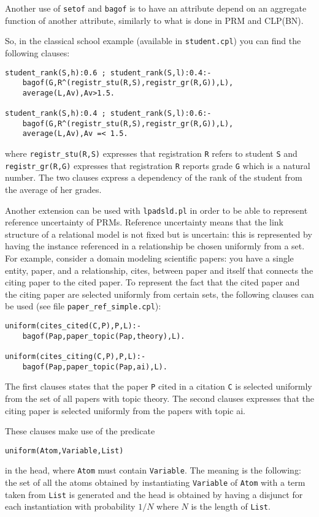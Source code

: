 \documentclass[a4paper,10pt]{scrartcl}
\begin{document}
Another use of \texttt{setof} and \texttt{bagof} is to have an attribute depend on an aggregate function of another attribute, similarly to what is done in PRM and CLP(BN).

So, in the classical school example (available in \texttt{student.cpl}) you can find the following
clauses:
\begin{verbatim}
student_rank(S,h):0.6 ; student_rank(S,l):0.4:- 
    bagof(G,R^(registr_stu(R,S),registr_gr(R,G)),L),
    average(L,Av),Av>1.5.

student_rank(S,h):0.4 ; student_rank(S,l):0.6:- 
    bagof(G,R^(registr_stu(R,S),registr_gr(R,G)),L),
    average(L,Av),Av =< 1.5.
\end{verbatim}
where \verb|registr_stu(R,S)| expresses that registration \texttt{R} refers to student \texttt{S} and \verb|registr_gr(R,G)| expresses that registration \texttt{R} reports  grade \texttt{G} which is a natural number. The two clauses express a dependency of the rank of the student from the average of her grades.

Another extension can be used with \texttt{lpadsld.pl} in order to be able to represent  reference uncertainty of PRMs. Reference uncertainty means that the link structure of a relational model is not fixed but is uncertain: this is represented by having the instance referenced in a relationship be chosen uniformly from a set. For example, consider a domain modeling scientific papers: you have a single entity, paper, and a relationship, cites, between paper and itself that connects the citing paper to the cited paper. To represent the fact that the cited paper and the citing paper are selected uniformly from certain sets, the following clauses can be used (see file \verb|paper_ref_simple.cpl|):
\begin{verbatim}
uniform(cites_cited(C,P),P,L):-
    bagof(Pap,paper_topic(Pap,theory),L).

uniform(cites_citing(C,P),P,L):-
    bagof(Pap,paper_topic(Pap,ai),L).
\end{verbatim}
The first clauses states that the  paper \texttt{P} cited in a citation \texttt{C} is selected uniformly from the set of all papers with topic theory.
The second clauses expresses that the citing paper is selected uniformly from the papers with
topic ai.

These clauses make use of the predicate
\begin{verbatim}
uniform(Atom,Variable,List)
\end{verbatim}
in the head, where \texttt{Atom} must contain \texttt{Variable}. The meaning is the following: the set of all the atoms obtained by instantiating \texttt{Variable} of \texttt{Atom} with a term taken from \texttt{List} is generated and the head is obtained by having a disjunct for each instantiation with probability $1/N$ where $N$ is the length of \texttt{List}.
\end{document}
